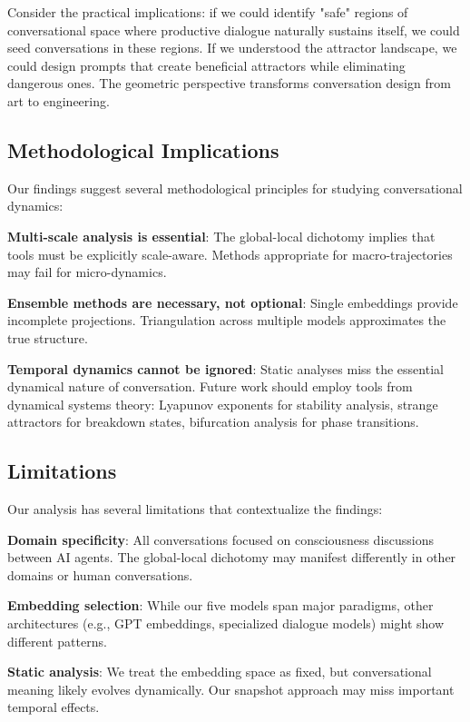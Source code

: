 \documentclass[11pt,letterpaper]{article}
\begin{document}
Consider the practical implications: if we could identify "safe" regions of conversational space where productive dialogue naturally sustains itself, we could seed conversations in these regions. If we understood the attractor landscape, we could design prompts that create beneficial attractors while eliminating dangerous ones. The geometric perspective transforms conversation design from art to engineering.

\subsection{Methodological Implications}

Our findings suggest several methodological principles for studying conversational dynamics:

\textbf{Multi-scale analysis is essential}: The global-local dichotomy implies that tools must be explicitly scale-aware. Methods appropriate for macro-trajectories may fail for micro-dynamics.

\textbf{Ensemble methods are necessary, not optional}: Single embeddings provide incomplete projections. Triangulation across multiple models approximates the true structure.

\textbf{Temporal dynamics cannot be ignored}: Static analyses miss the essential dynamical nature of conversation. Future work should employ tools from dynamical systems theory: Lyapunov exponents for stability analysis, strange attractors for breakdown states, bifurcation analysis for phase transitions.

\subsection{Limitations}

Our analysis has several limitations that contextualize the findings:

\textbf{Domain specificity}: All conversations focused on consciousness discussions between AI agents. The global-local dichotomy may manifest differently in other domains or human conversations.

\textbf{Embedding selection}: While our five models span major paradigms, other architectures (e.g., GPT embeddings, specialized dialogue models) might show different patterns.

\textbf{Static analysis}: We treat the embedding space as fixed, but conversational meaning likely evolves dynamically. Our snapshot approach may miss important temporal effects.
\end{document}
